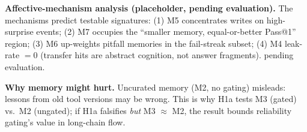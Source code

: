 \textbf{Affective-mechanism analysis (placeholder, pending evaluation).} The mechanisms predict testable signatures: (1) M5 concentrates writes on high-surprise events; (2) M7 occupies the ``smaller memory, equal-or-better Pass@1'' region; (3) M6 up-weights pitfall memories in the fail-streak subset; (4) M4 leak-rate $=0$ (transfer hits are abstract cognition, not answer fragments). \TBD{} pending evaluation.

\textbf{Why memory might hurt.} Uncurated memory (M2, no gating) misleads: lessons from old tool versions may be wrong. This is why H1a tests M3 (gated) vs.\ M2 (ungated); if H1a falsifies \emph{but} M3 $\approx$ M2, the result bounds reliability gating's value in long-chain flow.
